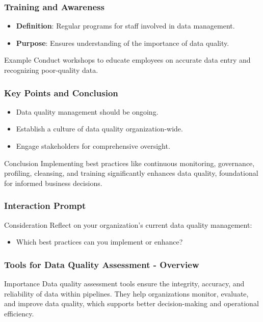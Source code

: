 \documentclass{beamer}
\begin{document}
\begin{frame}[fragile]
    \frametitle{Training and Awareness}
    \begin{itemize}
        \item \textbf{Definition}: Regular programs for staff involved in data management.
        \item \textbf{Purpose}: Ensures understanding of the importance of data quality.
    \end{itemize}
    \begin{block}{Example}
        Conduct workshops to educate employees on accurate data entry and recognizing poor-quality data.
    \end{block}
\end{frame}

\begin{frame}[fragile]
    \frametitle{Key Points and Conclusion}
    \begin{itemize}
        \item Data quality management should be ongoing.
        \item Establish a culture of data quality organization-wide.
        \item Engage stakeholders for comprehensive oversight.
    \end{itemize}
    \begin{block}{Conclusion}
        Implementing best practices like continuous monitoring, governance, profiling, cleansing, and training 
        significantly enhances data quality, foundational for informed business decisions.
    \end{block}
\end{frame}

\begin{frame}[fragile]
    \frametitle{Interaction Prompt}
    \begin{block}{Consideration}
        Reflect on your organization's current data quality management:
        \begin{itemize}
            \item Which best practices can you implement or enhance?
        \end{itemize}
    \end{block}
\end{frame}

\begin{frame}[fragile]
    \frametitle{Tools for Data Quality Assessment - Overview}
    \begin{block}{Importance}
        Data quality assessment tools ensure the integrity, accuracy, and reliability of data within pipelines. They help organizations monitor, evaluate, and improve data quality, which supports better decision-making and operational efficiency.
    \end{block}
\end{frame}
\end{document}
